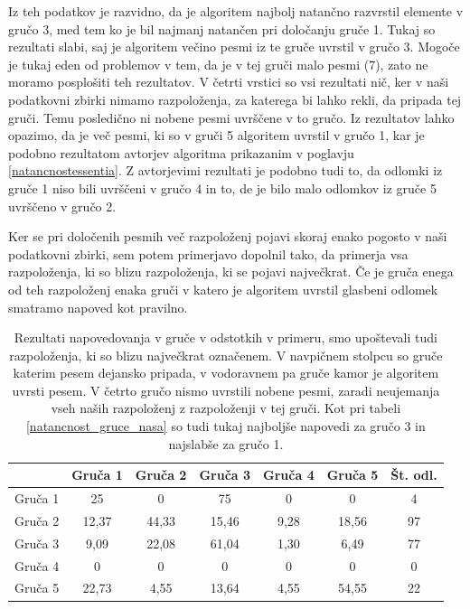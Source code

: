 \documentclass[a4paper, 12pt]{book}
\begin{document}
{Iz teh podatkov je razvidno, da je algoritem najbolj natančno razvrstil elemente v gručo 3, med tem ko je bil najmanj natančen pri določanju gruče 1. Tukaj so rezultati slabi, saj je algoritem večino pesmi iz te gruče uvrstil v gručo 3. Mogoče je tukaj eden od problemov v tem, da je v tej gruči malo pesmi (7), zato ne moramo posplošiti teh rezultatov. V četrti vrstici so vsi rezultati nič, ker v naši podatkovni zbirki nimamo razpoloženja, za katerega bi lahko rekli, da pripada tej gruči. Temu posledično ni nobene pesmi uvrščene v to gručo. Iz rezultatov lahko opazimo, da je več pesmi, ki so v gruči 5 algoritem uvrstil v gručo 1, kar je podobno rezultatom avtorjev algoritma prikazanim v poglavju \ref{natancnostessentia}. Z avtorjevimi rezultati je podobno tudi to, da odlomki iz gruče 1 niso bili uvrščeni v gručo 4 in to, de je bilo malo odlomkov iz gruče 5 uvrščeno v gručo 2.

Ker se pri določenih pesmih več razpoloženj pojavi skoraj enako pogosto v naši podatkovni zbirki, sem potem primerjavo dopolnil tako, da primerja vsa razpoloženja, ki so blizu razpoloženja, ki se pojavi največkrat. Če je gruča enega od teh razpoloženj enaka gruči v katero je algoritem uvrstil glasbeni odlomek smatramo napoved kot pravilno. 

\begin{table}[htb]
\begin{center}
\caption{Rezultati napovedovanja v gruče v odstotkih v primeru, smo upoštevali tudi razpoloženja, ki so blizu največkrat označenem. V navpičnem stolpcu so gruče katerim pesem dejansko pripada, v vodoravnem pa gruče kamor je algoritem uvrsti pesem. V četrto gručo nismo uvrstili nobene pesmi, zaradi neujemanja vseh naših razpoloženj z razpoloženji v tej gruči. Kot pri tabeli \ref{natancnost_gruce_nasa} so tudi tukaj najboljše napovedi za gručo 3 in najslabše za gručo 1. }
\begin{tabular}{|l|c|c|c|c|c|c|}
\hline
 & Gruča 1 & Gruča 2 & Gruča 3 & Gruča 4 & Gruča 5 & Št. odl.\\ \hline
Gruča 1 & 25 & 0	& 75 & 0 & 0 & 4\\ \hline
Gruča 2 & 12,37 & 44,33 & 15,46 & 9,28 & 18,56 & 97\\ \hline
Gruča 3 & 9,09 & 22,08 & 61,04 & 1,30 & 6,49 & 77\\ \hline
Gruča 4 & 0	& 0 & 0 & 0 & 0 & 0\\ \hline
Gruča 5 & 22,73	& 4,55 & 13,64 & 4,55 & 54,55 & 22 \\ \hline

\hline
\end{tabular}
\label{natancnost_gruce_nasa_with_second}
\end{center}
\end{table}

}
\end{document}
